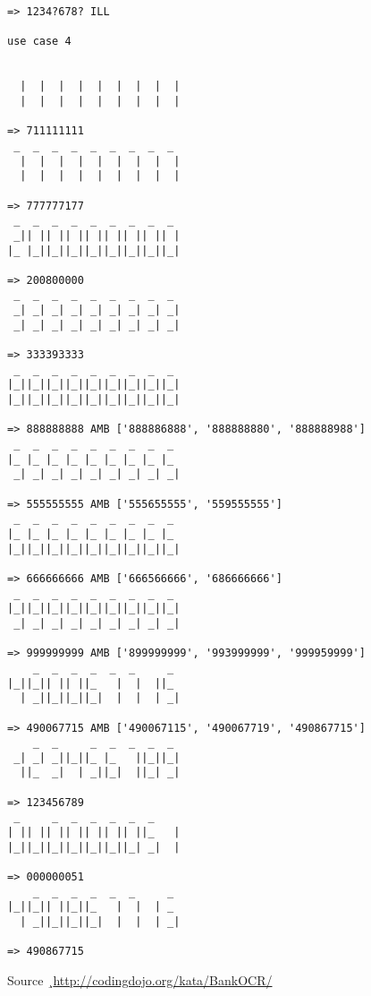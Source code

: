 \begin{lstlisting}[numbers=none]
=> 1234?678? ILL

use case 4


  |  |  |  |  |  |  |  |  |
  |  |  |  |  |  |  |  |  |

=> 711111111
 _  _  _  _  _  _  _  _  _ 
  |  |  |  |  |  |  |  |  |
  |  |  |  |  |  |  |  |  |

=> 777777177
 _  _  _  _  _  _  _  _  _ 
 _|| || || || || || || || |
|_ |_||_||_||_||_||_||_||_|

=> 200800000
 _  _  _  _  _  _  _  _  _ 
 _| _| _| _| _| _| _| _| _|
 _| _| _| _| _| _| _| _| _|

=> 333393333 
 _  _  _  _  _  _  _  _  _ 
|_||_||_||_||_||_||_||_||_|
|_||_||_||_||_||_||_||_||_|

=> 888888888 AMB ['888886888', '888888880', '888888988']
 _  _  _  _  _  _  _  _  _ 
|_ |_ |_ |_ |_ |_ |_ |_ |_ 
 _| _| _| _| _| _| _| _| _|

=> 555555555 AMB ['555655555', '559555555']
 _  _  _  _  _  _  _  _  _ 
|_ |_ |_ |_ |_ |_ |_ |_ |_ 
|_||_||_||_||_||_||_||_||_|

=> 666666666 AMB ['666566666', '686666666']
 _  _  _  _  _  _  _  _  _ 
|_||_||_||_||_||_||_||_||_|
 _| _| _| _| _| _| _| _| _|

=> 999999999 AMB ['899999999', '993999999', '999959999']
    _  _  _  _  _  _     _ 
|_||_|| || ||_   |  |  ||_ 
  | _||_||_||_|  |  |  | _|

=> 490067715 AMB ['490067115', '490067719', '490867715']
    _  _     _  _  _  _  _ 
 _| _| _||_||_ |_   ||_||_|
  ||_  _|  | _||_|  ||_| _|

=> 123456789
 _     _  _  _  _  _  _    
| || || || || || || ||_   |
|_||_||_||_||_||_||_| _|  |

=> 000000051
    _  _  _  _  _  _     _ 
|_||_|| ||_||_   |  |  | _ 
  | _||_||_||_|  |  |  | _|

=> 490867715 
\end{lstlisting}

Source ¸\url{http://codingdojo.org/kata/BankOCR/}